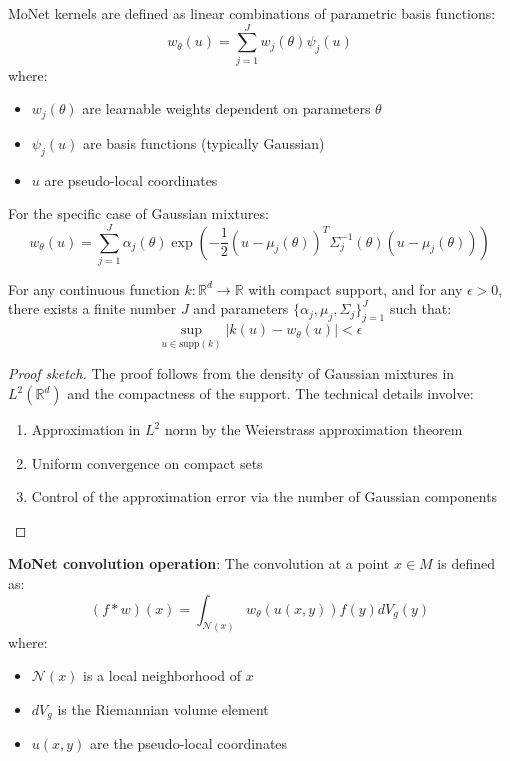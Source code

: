 \begin{definition}\label{def:kernel_monet}
MoNet kernels are defined as linear combinations of parametric basis functions:
\begin{equation}
w_\theta(u) = \sum_{j=1}^J w_j(\theta) \psi_j(u)
\end{equation}
where:
\begin{itemize}
    \item $w_j(\theta)$ are learnable weights dependent on parameters $\theta$
    \item $\psi_j(u)$ are basis functions (typically Gaussian)
    \item $u$ are pseudo-local coordinates
\end{itemize}

For the specific case of Gaussian mixtures:
\begin{equation}
w_\theta(u) = \sum_{j=1}^J \alpha_j(\theta) \exp\left(-\frac{1}{2}(u - \mu_j(\theta))^T \Sigma_j^{-1}(\theta) (u - \mu_j(\theta))\right)
\end{equation}
\end{definition}

\begin{theorem}\label{thm:universal_approximation_monet}
For any continuous function $k: \mathbb{R}^d \to \mathbb{R}$ with compact support, and for any $\epsilon > 0$, there exists a finite number $J$ and parameters $\{\alpha_j, \mu_j, \Sigma_j\}_{j=1}^J$ such that:
\begin{equation}
\sup_{u \in \text{supp}(k)} |k(u) - w_\theta(u)| < \epsilon
\end{equation}
\end{theorem}

\begin{proof}[Proof sketch]
The proof follows from the density of Gaussian mixtures in $L^2(\mathbb{R}^d)$ and the compactness of the support. The technical details involve:
\begin{enumerate}
    \item Approximation in $L^2$ norm by the Weierstrass approximation theorem
    \item Uniform convergence on compact sets
    \item Control of the approximation error via the number of Gaussian components
\end{enumerate}
\end{proof}

\textbf{MoNet convolution operation}: The convolution at a point $x \in M$ is defined as:
\begin{equation}
(f * w)(x) = \int_{\mathcal{N}(x)} w_\theta(u(x, y)) f(y) dV_g(y)
\end{equation}
where:
\begin{itemize}
    \item $\mathcal{N}(x)$ is a local neighborhood of $x$
    \item $dV_g$ is the Riemannian volume element
    \item $u(x, y)$ are the pseudo-local coordinates
\end{itemize}

